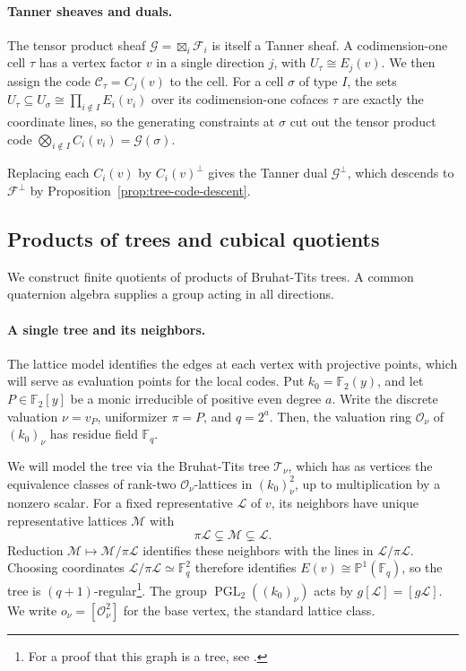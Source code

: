 \documentclass[11pt,letterpaper]{article}
\theoremstyle{definition}
\theoremstyle{remark}
\newcommand{\F}{\mathbb F}
\newcommand{\PP}{\mathbb P}
\newcommand{\cF}{\mathcal F}
\newcommand{\PGL}{\operatorname{PGL}}
\begin{document}
\paragraph{Tanner sheaves and duals.}
The tensor product sheaf $\mathcal G=\boxtimes_i\cF_i$ is itself a
Tanner sheaf. A codimension-one cell $\tau$ has a vertex factor $v$ in
a single direction $j$, with $U_\tau\cong E_j(v)$. We then assign the code $\mathcal C_\tau=C_j(v)$ to the cell. For a cell $\sigma$ of type $I$, the sets
$U_\tau\subseteq U_\sigma\cong\prod_{i\notin I}E_i(v_i)$ over its
codimension-one cofaces $\tau$ are exactly the coordinate lines, so the
generating constraints at $\sigma$ cut out the tensor product code
$\bigotimes_{i\notin I}C_i(v_i)=\mathcal G(\sigma)$.

Replacing each $C_i(v)$ by $C_i(v)^\perp$ gives the Tanner dual
$\mathcal G^\perp$, which descends to $\cF^\perp$ by
Proposition~\ref{prop:tree-code-descent}.

\subsection{Products of trees and cubical quotients}
\label{sec:finite-presentation}
We construct finite quotients of products of Bruhat-Tits trees.
A common quaternion algebra supplies a group acting in all directions.

\paragraph{A single tree and its neighbors.}
The lattice model identifies the edges at each vertex with projective
points, which will serve as evaluation points for the local codes.
Put $k_0=\F_2(y)$, and let $P\in\F_2[y]$ be a monic irreducible
of positive even degree $a$. Write the discrete valuation $\nu=v_P$, uniformizer $\pi=P$, and $q=2^a$. Then, the valuation ring $\mathcal O_\nu$ of $(k_0)_\nu$ has residue field $\F_q$.

We will model the tree via the Bruhat-Tits tree $\mathcal T_\nu$, which has as vertices the equivalence classes of rank-two
$\mathcal O_\nu$-lattices in $(k_0)_\nu^2$, up to multiplication
by a nonzero scalar. For a fixed representative $\mathcal L$ of
$v$, its neighbors have unique representative lattices $\mathcal M$ with
\[
 \pi\mathcal L\subsetneq\mathcal M\subsetneq\mathcal L.
\]
Reduction $\mathcal M\mapsto\mathcal M/\pi\mathcal L$ identifies
these neighbors with the lines in $\mathcal L/\pi\mathcal L$.
Choosing coordinates $\mathcal L/\pi\mathcal L\simeq\F_q^2$
therefore identifies $E(v)\cong\PP^1(\F_q)$, so the tree is
$(q+1)$-regular\footnote{For a proof that this graph is a tree, see
\cite[Chapter~II, \S1.1]{Serre1980}.}.
The group $\PGL_2((k_0)_\nu)$ acts by $g[\mathcal L]=[g\mathcal L]$.
We write $o_\nu=[\mathcal O_\nu^2]$ for the base vertex,
the standard lattice class.
\end{document}

